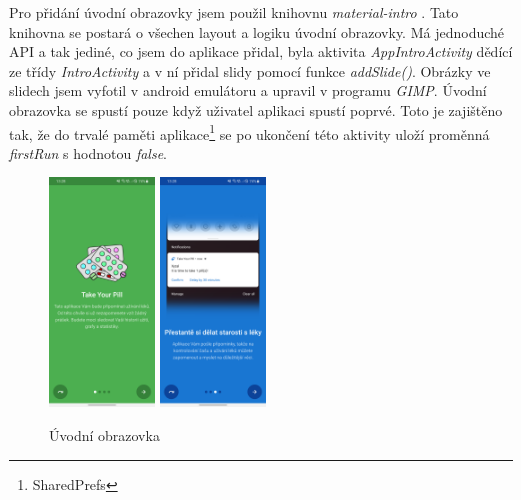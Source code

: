 \documentclass[../TakeYourPill.tex]{subfiles}
\begin{document}
Pro přidání úvodní obrazovky jsem použil knihovnu \textit{material-intro} \cite{intro}. Tato knihovna se postará o všechen layout a logiku úvodní obrazovky. Má jednoduché API a tak jediné, co jsem do aplikace přidal, byla aktivita \textit{AppIntroActivity} dědící ze třídy \textit{IntroActivity} a v ní přidal slidy pomocí funkce \textit{addSlide()}. Obrázky ve slidech jsem vyfotil v android emulátoru a upravil v programu \textit{GIMP}. Úvodní obrazovka se spustí pouze když uživatel aplikaci spustí poprvé. Toto je zajištěno tak, že do trvalé paměti aplikace\footnote{SharedPrefs} se po ukončení této aktivity uloží proměnná \textit{firstRun} s hodnotou \textit{false}.

\begin{figure}[h]
    \centering
    \includegraphics[width=0.25\textwidth]{app-intro-screenshot}
    \includegraphics[width=0.25\textwidth]{app-intro-screenshot-2}
    \caption{Úvodní obrazovka}
\end{figure}
\end{document}
